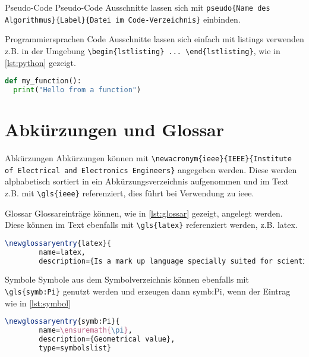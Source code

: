 \documentclass[10pt,aspectratio=\ratio,
compress
]{beamer}
\begin{document}
\begin{frame}[containsverbatim]{Pseudo-Code}
Pseudo-Code Ausschnitte lassen sich mit \lstinline|pseudo{Name des Algorithmus}{Label}{Datei im Code-Verzeichnis}| einbinden.
\end{frame}

\begin{frame}[containsverbatim]{Programmiersprachen}
Code Ausschnitte lassen sich einfach mit listings verwenden z.B. in der Umgebung \lstinline|\begin{lstlisting} ... \end{lstlisting}|, wie in \autoref{lst:python} gezeigt.

\begin{lstlisting}[language=Python, caption={Simple Python program}, label=lst:python]
def my_function():
  print("Hello from a function")
\end{lstlisting}
\end{frame}

\section{Abkürzungen und Glossar}

\begin{frame}[containsverbatim]{Abkürzungen}
Abkürzungen können mit \lstinline|\newacronym{ieee}{IEEE}{Institute of Electrical and Electronics Engineers}| angegeben werden. Diese werden alphabetisch sortiert in ein Abkürzungsverzeichnis aufgenommen und im Text z.B. mit \lstinline|\gls{ieee}| referenziert, dies führt bei Verwendung zu \gls{ieee}.
\end{frame}

\begin{frame}[containsverbatim]{Glossar}
Glossareinträge können, wie in \autoref{lst:glossar} gezeigt, angelegt werden. Diese können im Text ebenfalls mit \lstinline|\gls{latex}| referenziert werden, z.B. \gls{latex}.
\begin{lstlisting}[caption=Glossareinträge, label=lst:glossar, language=TeX]
 \newglossaryentry{latex}{
        name=latex,
        description={Is a mark up language specially suited for scientific documents}}
\end{lstlisting}
\end{frame}

\begin{frame}[containsverbatim]{Symbole}
Symbole aus dem Symbolverzeichnis können ebenfalls mit \lstinline|\gls{symb:Pi}| genutzt werden und erzeugen dann \gls{symb:Pi}, wenn der Eintrag wie in \autoref{lst:symbol}
\begin{lstlisting}[caption=Einträge für das Symbolverzeichnis, label=lst:symbol, language=TeX]
\newglossaryentry{symb:Pi}{
        name=\ensuremath{\pi},
        description={Geometrical value},
        type=symbolslist}
\end{lstlisting}
\end{frame}
\end{document}

